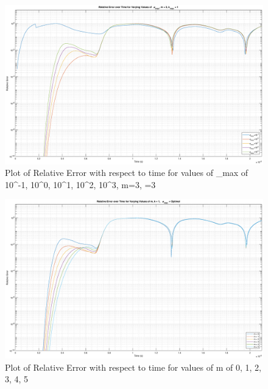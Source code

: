 \documentclass{article}
\begin{document}
\begin{figure}
  \centering
  \includegraphics[width=\textwidth]{Rel_Err_SigMax_m3}
  \caption{Plot of Relative Error with respect to time for values of
    \sigma_{max} of 10^{-1}, 10^0, 10^1, 10^2, 10^3, m=3, =3}\label{fig:RelErrSigmaxm3}
\end{figure}


\begin{figure}
  \centering
  \includegraphics[width=\textwidth]{Rel_Err_m}
  \caption{Plot of Relative Error with respect to time for values of m of 0, 1,
    2, 3, 4, 5}\label{fig:RelErrm}
\end{figure}
\end{document}
